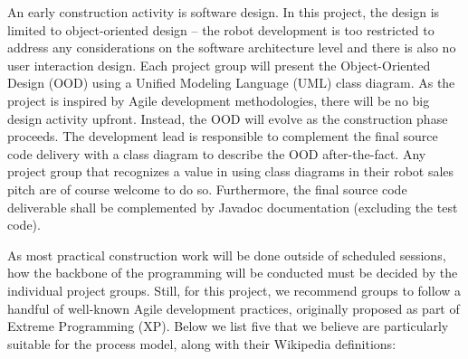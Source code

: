 \documentclass{scrreprt}
\begin{document}
An early construction activity is software design. In this project, the design is limited to object-oriented design -- the robot development is too restricted to address any considerations on the software architecture level and there is also no user interaction design. Each project group will present the Object-Oriented Design (OOD) using a Unified Modeling Language (UML) class diagram. As the project is inspired by Agile development methodologies, there will be no big design activity upfront. Instead, the OOD will evolve as the construction phase proceeds. The development lead is responsible to complement the final source code delivery with a class diagram to describe the OOD after-the-fact. Any project group that recognizes a value in using class diagrams in their robot sales pitch are of course welcome to do so. Furthermore, the final source code deliverable shall be complemented by Javadoc documentation (excluding the test code).  

As most practical construction work will be done outside of scheduled sessions, how the backbone of the programming will be conducted must be decided by the individual project groups. Still, for this project, we recommend groups to follow a handful of well-known Agile development practices, originally proposed as part of Extreme Programming (XP). Below we list five that we believe are particularly suitable for the process model, along with their Wikipedia definitions:
\end{document}
